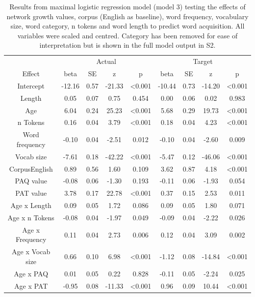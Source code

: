 \documentclass[
  man,mask,floatsintext]{apa6}
\begin{document}
\begin{longtable}[t]{ccccccccc}
\caption{\label{tab:table-data-summary}Results from maximal logistic regression model (model 3) testing the effects of network growth values, corpus (English as baseline), word frequency, vocabulary size, word category, n tokens and word length to predict word acquisition. All variables were scaled and centred. Category has been removed for ease of interpretation but is shown in the full model output in S2.}\\
\toprule
\multicolumn{1}{c}{ } & \multicolumn{4}{c}{Actual} & \multicolumn{4}{c}{Target} \\
\cmidrule(l{3pt}r{3pt}){2-5} \cmidrule(l{3pt}r{3pt}){6-9}
Effect & beta & SE & z & p & beta & SE & z & p\\
\midrule
Intercept & -12.16 & 0.57 & -21.33 & <0.001 & -10.44 & 0.73 & -14.20 & <0.001\\
Length & 0.05 & 0.07 & 0.75 & 0.454 & 0.00 & 0.06 & 0.02 & 0.983\\
Age & 6.04 & 0.24 & 25.23 & <0.001 & 5.68 & 0.29 & 19.73 & <0.001\\
n Tokens & 0.16 & 0.04 & 3.79 & <0.001 & 0.18 & 0.04 & 4.23 & <0.001\\
Word frequency & -0.10 & 0.04 & -2.51 & 0.012 & -0.10 & 0.04 & -2.60 & 0.009\\
\addlinespace
Vocab size & -7.61 & 0.18 & -42.22 & <0.001 & -5.47 & 0.12 & -46.06 & <0.001\\
CorpusEnglish & 0.89 & 0.56 & 1.60 & 0.109 & 3.62 & 0.87 & 4.18 & <0.001\\
PAQ value & -0.08 & 0.06 & -1.30 & 0.193 & -0.11 & 0.06 & -1.93 & 0.054\\
PAT value & 3.78 & 0.17 & 22.78 & <0.001 & 0.37 & 0.15 & 2.53 & 0.011\\
Age x Length & 0.09 & 0.05 & 1.72 & 0.086 & 0.09 & 0.05 & 1.80 & 0.071\\
\addlinespace
Age x n Tokens & -0.08 & 0.04 & -1.97 & 0.049 & -0.09 & 0.04 & -2.22 & 0.026\\
Age x Frequency & 0.11 & 0.04 & 2.73 & 0.006 & 0.12 & 0.04 & 3.09 & 0.002\\
Age x Vocab size & 0.66 & 0.10 & 6.98 & <0.001 & -1.12 & 0.08 & -14.84 & <0.001\\
Age x PAQ & 0.01 & 0.05 & 0.22 & 0.828 & -0.11 & 0.05 & -2.24 & 0.025\\
Age x PAT & -0.95 & 0.08 & -11.33 & <0.001 & 0.96 & 0.09 & 10.44 & <0.001\\
\bottomrule
\end{longtable}
\end{document}
